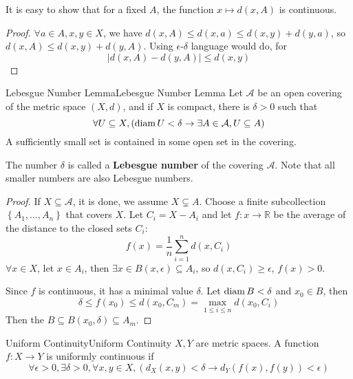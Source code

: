 \documentclass[../main.tex]{subfiles}
\begin{document}
It is easy to show that for a fixed $A$, the function $x \mapsto d(x,A)$ is continuous.
\begin{proof}
$\forall a\in A,x,y\in X$, we have $d(x,A) \leq d(x,a) \leq d(x,y)+d(y,a)$, so $d(x,A) \leq d(x,y)+d(y,A)$. Using $\epsilon$-$\delta$ language would do, for
\begin{equation*}
\left|d(x,A)-d(y,A)\right| \leq d(x,y)
\end{equation*}
\end{proof}

\begin{lemma}{Lebesgue Number Lemma}{Lebesgue Number Lemma}
Let $\mathcal{A}$ be an open covering of the metric space $(X,d)$, and if $X$ is compact, there is $\delta>0$ such that
\begin{equation*}
\forall U \subseteq X, (\operatorname{diam} U < \delta \rightarrow \exists A\in \mathcal{A}, U \subseteq A)
\end{equation*}
A sufficiently small set is contained in some open set in the covering.

The number $\delta$ is called a \textbf{Lebesgue number} of the covering $\mathcal{A}$. Note that all smaller numbers are also Lebesgue numbers.
\end{lemma}
\begin{proof}
If $X \subseteq \mathcal{A}$, it is done, we assume $X \subsetneq A$. Choose a finite subcollection $\left\{ A_1, \ldots ,A_n \right\}$ that covers $X$. Let $C_i = X-A_i$ and let $f:x \rightarrow \mathbb{R}$ be the average of the distance to the closed sets $C_i$:
\begin{equation*}
	f(x) = \frac{1}{n}\sum_{i=1}^{n} d(x,C_i)
\end{equation*}
$\forall x\in X$, let $x\in A_i$, then $\exists x\in B(x, \epsilon) \subseteq A_i$, so $d(x,C_i) \geq \epsilon$, $f(x) >0$.

Since  $f$ is continuous, it has a minimal value $\delta$. Let $\operatorname{diam} B < \delta$ and $x_0\in B$, then
\begin{equation*}
	\delta\leq f(x_0) \leq d(x_0,C_m) = \max_{1\leq i\leq n} d(x_0,C_i)
\end{equation*}
Then the $B \subseteq B(x_0,\delta) \subseteq A_m$.
\end{proof}

\begin{definition}{Uniform Continuity}{Uniform Continuity}
$X,Y$ are metric spaces. A function $f:X \rightarrow Y$ is uniformly continuous if
\begin{equation*}
\forall \epsilon>0, \exists \delta>0, \forall x,y\in X, (d_X(x,y)<\delta \rightarrow d_Y(f(x),f(y))<\epsilon)
\end{equation*}
\end{definition}
\end{document}
